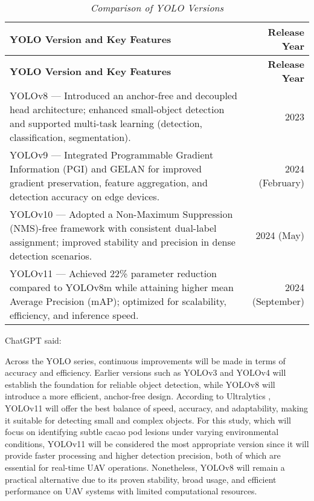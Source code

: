 \begin{longtable}{p{8cm} r}
	\caption{\textit{Comparison of YOLO Versions}} \label{tab:yolo_comparison} \\
	
	\toprule
	\textbf{YOLO Version and Key Features} & \textbf{Release Year} \\
	\midrule
	\endfirsthead
	
	\toprule
	\textbf{YOLO Version and Key Features} & \textbf{Release Year} \\
	\midrule
	\endhead
	
	\bottomrule
	\endfoot
	
	YOLOv8 — Introduced an anchor-free and decoupled head architecture; enhanced small-object detection and supported multi-task learning (detection, classification, segmentation). & 2023 \\
	\midrule
	YOLOv9 — Integrated Programmable Gradient Information (PGI) and GELAN for improved gradient preservation, feature aggregation, and detection accuracy on edge devices. & 2024 (February) \\
	\midrule
	YOLOv10 — Adopted a Non-Maximum Suppression (NMS)-free framework with consistent dual-label assignment; improved stability and precision in dense detection scenarios. & 2024 (May) \\
	\midrule
	YOLOv11 — Achieved 22\% parameter reduction compared to YOLOv8m while attaining higher mean Average Precision (mAP); optimized for scalability, efficiency, and inference speed. & 2024 (September) \\
\end{longtable}

ChatGPT said:

Across the YOLO series, continuous improvements will be made in terms of accuracy and efficiency. Earlier versions such as YOLOv3 and YOLOv4 will establish the foundation for reliable object detection, while YOLOv8 will introduce a more efficient, anchor-free design. According to Ultralytics \cite{UltralyticsBlog2025}, YOLOv11 will offer the best balance of speed, accuracy, and adaptability, making it suitable for detecting small and complex objects. For this study, which will focus on identifying subtle cacao pod lesions under varying environmental conditions, YOLOv11 will be considered the most appropriate version since it will provide faster processing and higher detection precision, both of which are essential for real-time UAV operations. Nonetheless, YOLOv8 will remain a practical alternative due to its proven stability, broad usage, and efficient performance on UAV systems with limited computational resources.

